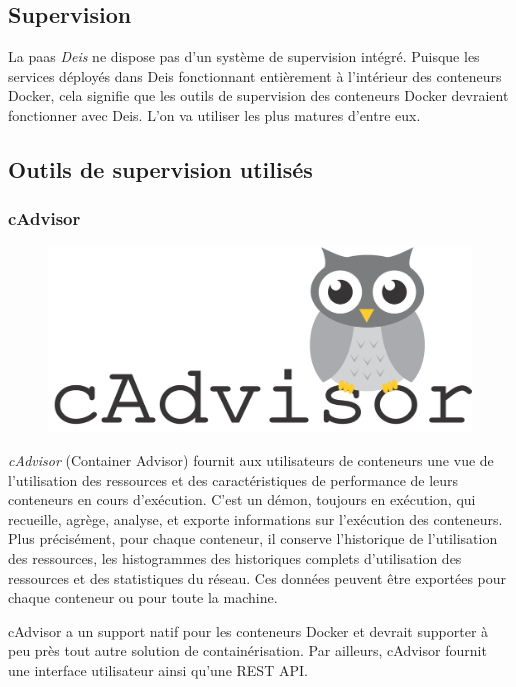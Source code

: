\begin{onehalfspace}
\section{Supervision}

La \acrshort{paas} \emph{Deis} ne dispose pas d'un système de supervision intégré. Puisque les services déployés dans Deis fonctionnant entièrement à l'intérieur des conteneurs Docker, cela signifie que les outils de supervision des conteneurs Docker devraient fonctionner avec Deis. L'on va utiliser les plus matures d'entre eux.


\subsection{Outils de supervision utilisés}

	
\subsubsection*{cAdvisor}


\begin{figure}
\centering
\includegraphics[scale=0.2]{chapitre5/assets/cadvisor}
\end{figure}
\noindent \emph{cAdvisor} (Container Advisor) fournit aux utilisateurs de conteneurs une vue de l'utilisation des ressources et des caractéristiques de performance de leurs conteneurs en cours d'exécution. C'est un démon, toujours en exécution, qui recueille, agrège, analyse, et exporte informations sur l'exécution des conteneurs. Plus précisément, pour chaque conteneur, il conserve l'historique de l'utilisation des ressources, les histogrammes des historiques complets d'utilisation des ressources et des statistiques du réseau. Ces données peuvent être exportées pour chaque conteneur ou pour toute la machine.

cAdvisor a un support natif pour les conteneurs Docker et devrait supporter à peu près tout autre solution de containérisation. Par ailleurs, cAdvisor fournit une interface utilisateur ainsi qu'une REST API.



\end{onehalfspace}

